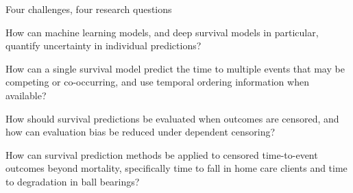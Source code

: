 \begin{frame}{Four challenges, four research questions}
\footnotesize
\begin{description}[RQ4.]
  \item[RQ1.] How can machine learning models, and deep survival models in particular, quantify uncertainty in individual predictions?
  \item[RQ2.] How can a single survival model predict the time to multiple events that may be competing or co-occurring, and use temporal ordering information when available?
  \item[RQ3.] How should survival predictions be evaluated when outcomes are censored, and how can evaluation bias be reduced under dependent censoring?
  \item[RQ4.] How can survival prediction methods be applied to censored time-to-event outcomes beyond mortality, specifically time to fall in home care clients and time to degradation in ball bearings?
\end{description}
\vspace{-0.6em}
\end{frame}

